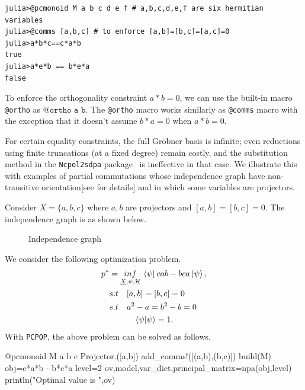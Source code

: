 \begin{lstlisting}[style=code, mathescape=true]
julia>@pcmonoid M a b c d e f # a,b,c,d,e,f are six hermitian variables
julia>@comms [a,b,c] # to enforce [a,b]=[b,c]=[a,c]=0
julia>a*b*c==c*a*b
true
julia>a*e*b == b*e*a
false 
\end{lstlisting}
To enforce the orthogonality constraint $a*b=0$, we can use the built-in macro \texttt{@ortho} as $\texttt{@ortho a b}$. The \texttt{@ortho} macro works similarly as \texttt{@comms} macro with the exception that it doesn't assume $b*a=0$ when $a*b=0$.

For certain equality constraints, the full Gr\"obner basis is infinite; even reductions using finite truncations (at a fixed degree) remain costly, and the substitution method in the \texttt{Ncpol2sdpa} package~\cite{10.1145/2699464} is ineffective in that case. We illustrate this with examples of partial commutations whose independence graph have non-transitive orientation[see \cite{} for details] and in which some variables are projectors.  

\begin{example}
  \label{ex:3comms}

    Consider $X=\{a,b,c\}$ where $a,b$ are projectors and $[a,b]=[b,c]=0$. The independence graph is as shown below. 
    \begin{figure}[H]
    \centering
    \caption{Independence graph}
    \end{figure}

    We consider the following optimization problem.
\begin{equation}
   \begin{split}
       p^* &=\underset{\underline{X} , \psi , \mathcal{H}}{inf} \: \braket{\psi| \: c a b-b c a\: |\psi}, \\
    & s.t \quad [a,b]=[b,c] =0\\
    & s.t \quad a^2-a = b^2-b = 0 \\
    & \qquad \quad \braket{\psi | \psi} = 1. \\ 
\end{split}
\end{equation} 
With \texttt{PCPOP}, the above problem can be solved as follows.
\begin{code}
    @pcmonoid M a b c
    Projector.([a,b])
    add_comms!([(a,b),(b,c)])
    build(M)
    obj=c*a*b - b*c*a
    level=2
    ov,model,var_dict,principal_matrix=npa(obj,level)
    println("Optimal value is ",ov)
\end{code}
\end{example}

